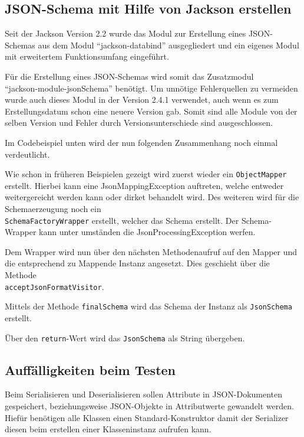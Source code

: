 

\subsection{JSON-Schema mit Hilfe von Jackson erstellen}
Seit der Jackson Version 2.2 wurde das Modul zur Erstellung eines JSON-Schemas aus dem Modul "`jackson-databind"' ausgegliedert und ein eigenes Modul mit erweitertem Funktionsumfang eingef\"uhrt. 

F\"ur die Erstellung eines JSON-Schemas wird somit das Zusatzmodul \\"`jackson-module-jsonSchema"' ben\"otigt. Um unn\"otige Fehlerquellen zu vermeiden wurde auch dieses Modul in der Version 2.4.1 verwendet, auch wenn es zum Erstellungsdatum schon eine neuere Version gab. Somit sind alle Module von der selben Version und Fehler durch Versionsunterschiede sind ausgeschlossen.

Im Codebeispiel unten wird der nun folgenden Zusammenhang noch einmal verdeutlicht.

Wie schon in fr\"uheren Beispielen gezeigt wird zuerst wieder ein \texttt{ObjectMapper} erstellt. Hierbei kann eine JsonMappingException auftreten, welche entweder weitergereicht werden kann oder dirket behandelt wird.
Des weiteren wird f\"ur die Schemaerzeugung noch ein \\\texttt{SchemaFactoryWrapper} erstellt, welcher das Schema erstellt.
Der Schema-Wrapper kann unter umst\"anden die JsonProcessingException werfen.

Dem Wrapper wird nun \"uber den n\"achsten Methodenaufruf auf den Mapper und die entsprechend zu Mappende Instanz angesetzt. Dies geschieht \"uber die Methode \\\texttt{acceptJsonFormatVisitor}.

Mittels der Methode \texttt{finalSchema} wird das Schema der Instanz als \texttt{JsonSchema} erstellt.

\"Uber den \texttt{return}-Wert wird das \texttt{JsonSchema} als String \"ubergeben.



\subsection{Auff\"alligkeiten beim Testen}
Beim Serialisieren und Deserialisieren sollen Attribute in JSON-Dokumenten gespeichert, beziehungsweise JSON-Objekte in Attributwerte gewandelt werden. Hief\"ur ben\"otigen alle Klassen einen Standard-Konstruktor damit der Serializer diesen beim erstellen einer Klasseninstanz aufrufen kann. 

